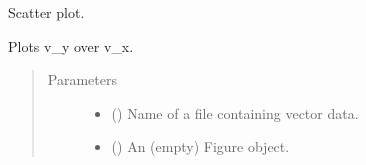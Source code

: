 \documentclass[letterpaper,10pt,english]{sphinxmanual}
\begin{document}
\begin{fulllineitems}
\label{\detokenize{vec_plot:openpivgui.vec_plot.scatter}}
Scatter plot.

Plots v\_y over v\_x.
\begin{quote}\begin{description}
\item[{Parameters}] \leavevmode\begin{itemize}
\item {} 
 () \textendash{} Name of a file containing vector data.

\item {} 
 () \textendash{} An (empty) Figure object.

\end{itemize}

\end{description}\end{quote}

\end{fulllineitems}

\end{document}
